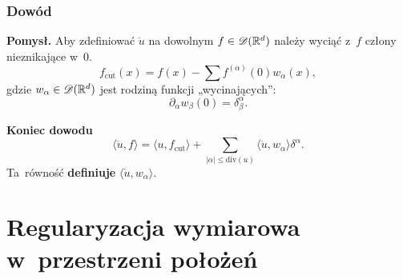 \documentclass[10pt,t]{beamer}
\newcommand{\divDegree}{\textrm{div}}
\begin{document}
\begin{frame}
  \frametitle{Dowód}


  \textbf{Pomysł.}
  Aby zdefiniować $\dot{ u }$ na dowolnym $f \in \mathcal{D}( \mathbb{R}^{ d } )$ należy
  wyciąć z~$f$ człony nieznikające w~0.
  \begin{equation}
    \label{eq:Epstein-Glaser-11}
    f_{ \textrm{cut} }( x ) =
    f( x ) - \sum f^{ ( \alpha ) }( 0 ) w_{ \alpha }( x ),
  \end{equation}
  gdzie $w_{ \alpha } \in \mathcal{D}( \mathbb{R}^{ d } )$ jest rodziną funkcji
  „wycinających”:
  \begin{equation}
    \label{eq:Epstein-Glaser-12}
    \partial_{ \alpha } w_{ \beta }( 0 ) = \delta^{ \alpha }_{ \beta }.
  \end{equation}

  \vspace{\spaceFour}



  \textbf{Koniec dowodu}
  \begin{equation}
    \label{eq:Epstein-Glaser-13}
    \langle \dot{ u }, f \rangle =
    \langle u, f_{ \textrm{cut} } \rangle
    + \sum\limits_{ | \alpha | \leq \divDegree( u ) }
    \langle \dot{ u }, w_{ \alpha } \rangle \delta^{ \alpha }.
  \end{equation}
  Ta~równość \textbf{definiuje} $\langle \dot{ u }, w_{ \alpha } \rangle$.

\end{frame}










\section{Regularyzacja wymiarowa w~przestrzeni położeń}
\end{document}
